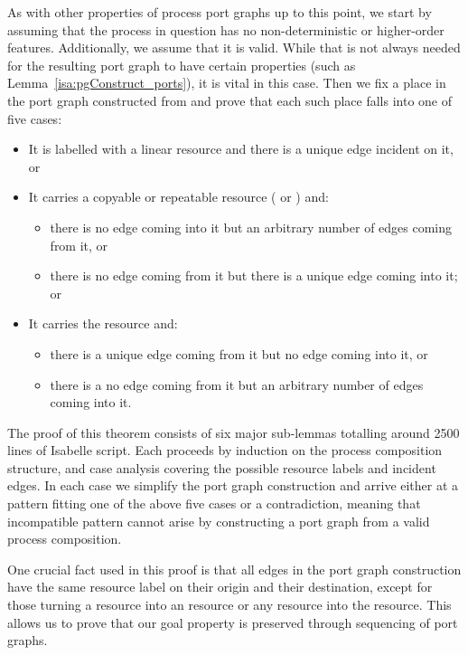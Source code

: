 \documentclass[class=smolathesis,crop=false]{standalone}
\begin{document}
\cbstart
As with other properties of process port graphs up to this point, we start by assuming that the process  in question has no non-deterministic or higher-order features.
Additionally, we assume that it is valid.
While that is not always needed for the resulting port graph to have certain properties (such as Lemma~\ref{isa:pgConstruct_ports}), it is vital in this case.
Then we fix a place  in the port graph constructed from  and prove that each such place falls into one of five cases:
\cbend
\begin{itemize}
  \item It is labelled with a linear resource and there is a unique edge incident on it, or
  \item It carries a copyable or repeatable resource ( or ) and:
    \begin{itemize}
      \item there is no edge coming into it but an arbitrary number of edges coming from it, or
      \item there is no edge coming from it but there is a unique edge coming into it; or
    \end{itemize}
  \item It carries the  resource and:
    \begin{itemize}
      \item there is a unique edge coming from it but no edge coming into it, or
      \item there is a no edge coming from it but an arbitrary number of edges coming into it.
    \end{itemize}
\end{itemize}

The proof of this theorem consists of six major sub-lemmas totalling around 2500 lines of Isabelle script.
Each proceeds by induction on the process composition structure, and case analysis covering the possible resource labels and incident edges.
In each case we simplify the port graph construction and arrive either at a pattern fitting one of the above five cases or a contradiction, meaning that incompatible pattern cannot arise by constructing a port graph from a valid process composition.

One crucial fact used in this proof is that all edges in the port graph construction have the same resource label on their origin and their destination, except for those turning a  resource into an  resource or any resource into the  resource.
This allows us to prove that our goal property is preserved through sequencing of port graphs.
\end{document}
